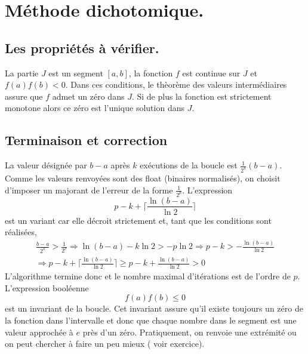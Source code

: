 \section{Méthode dichotomique.}
\subsection{Les propriétés à vérifier.}
La partie $J$ est un segment $[a,b]$, la fonction $f$ est continue sur $J$ et $f(a)f(b)<0$. Dans ces conditions, le thèorème des valeurs intermédiaires assure que $f$ admet un zéro dans $J$. Si de plus la fonction est strictement monotone alors ce zéro est l'unique solution dans $J$. 

\subsection{Terminaison et correction}
La valeur désignée par $b-a$ après $k$ exécutions de la boucle est $\frac{1}{2^k}(b-a)$. Comme les valeurs renvoyées sont des float (binaires normalisés), on choisit d'imposer un majorant de l'erreur de la forme $\frac{1}{2^p}$. L'expression 
\begin{displaymath}
p-k + \lceil \frac{\ln(b-a)}{\ln 2}\rceil  
\end{displaymath}
 est  un variant car elle décroit strictement et, tant que les conditions sont réalisées,
\begin{multline*}
  \frac{b-a}{2^k} >\frac{1}{2^p} \Rightarrow 
  \ln(b-a) - k\ln 2 > -p\ln 2 \Rightarrow p-k > -\frac{\ln(b-a)}{\ln 2} \\
  \Rightarrow p-k + \lceil \frac{\ln(b-a)}{\ln 2}\rceil \geq p-k + \frac{\ln(b-a)}{\ln 2} >0
\end{multline*}
L'algorithme termine donc et le nombre maximal d'itérations est de l'ordre de $p$.
L'expression booléenne
\begin{displaymath}
  f(a)f(b)\leq 0
\end{displaymath}
est un invariant de la boucle. Cet invariant assure qu'il existe toujours un zéro de la fonction dans l'intervalle et donc que chaque nombre dans le segment est une valeur approchée à $e$ près d'un zéro. Pratiquement, on renvoie une extrémité ou on peut chercher à faire un peu mieux ( voir exercice).

